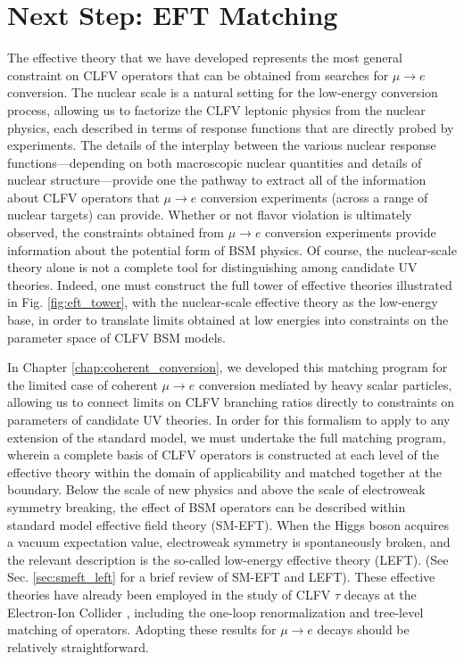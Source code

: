 \documentclass{book}[letterpaper,12pt]
\begin{document}
\section{Next Step: EFT Matching}
The effective theory that we have developed represents the most general constraint on CLFV operators that can be obtained from searches for $\mu\rightarrow e$ conversion. The nuclear scale is a natural setting for the low-energy conversion process, allowing us to factorize the CLFV leptonic physics from the nuclear physics, each described in terms of response functions that are directly probed by experiments. The details of the interplay between the various nuclear response functions---depending on both macroscopic nuclear quantities and details of nuclear structure---provide one the pathway to extract all of the information about CLFV operators that $\mu\rightarrow e$ conversion experiments (across a range of nuclear targets) can provide. Whether or not flavor violation is ultimately observed, the constraints obtained from $\mu\rightarrow e$ conversion experiments provide information about the potential form of BSM physics. Of course, the nuclear-scale theory alone is not a complete tool for distinguishing among candidate UV theories. Indeed, one must construct the full tower of effective theories illustrated in Fig. \ref{fig:eft_tower}, with the nuclear-scale effective theory as the low-energy base, in order to translate limits obtained at low energies into constraints on the parameter space of CLFV BSM models.

In Chapter \ref{chap:coherent_conversion}, we developed this matching program for the limited case of coherent $\mu\rightarrow e$ conversion mediated by heavy scalar particles, allowing us to connect limits on CLFV branching ratios directly to constraints on parameters of candidate UV theories. In order for this formalism to apply to any extension of the standard model, we must undertake the full matching program, wherein a complete basis of CLFV operators is constructed at each level of the effective theory within the domain of applicability and matched together at the boundary. Below the scale of new physics and above the scale of electroweak symmetry breaking, the effect of BSM operators can be described within standard model effective field theory (SM-EFT). When the Higgs boson acquires a vacuum expectation value, electroweak symmetry is spontaneously broken, and the relevant description is the so-called low-energy effective theory (LEFT). (See Sec. \ref{sec:smeft_left} for a brief review of SM-EFT and LEFT). These effective theories have already been employed in the study of CLFV $\tau$ decays at the Electron-Ion Collider \cite{Cirigliano:2021img}, including the one-loop renormalization and tree-level matching of operators. Adopting these results for $\mu\rightarrow e$ decays should be relatively straightforward.
\end{document}
